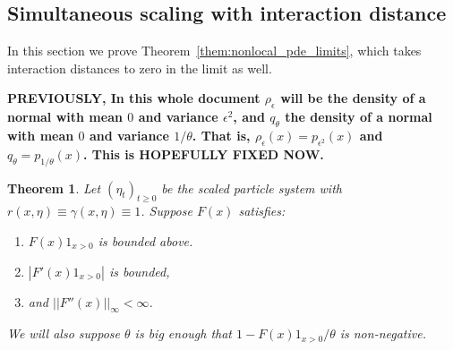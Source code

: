 \documentclass[12pt]{article}
\newtheorem{theorem}{Theorem}[section]
\begin{document}
\subsection{Simultaneous scaling with interaction distance}

In this section we prove Theorem~\ref{them:nonlocal_pde_limits},
which takes interaction distances to zero in the limit as well.

\textbf{PREVIOUSLY, In this whole document $\rho_\epsilon$ will be the density of a normal with mean $0$ and variance $\epsilon^2$, and $q_\theta$ the density of a normal with mean $0$ and variance $1/\theta$. That is, $\rho_\epsilon(x) = p_{\epsilon^2}(x)$ and $q_\theta = p_{1/\theta}(x)$. This is HOPEFULLY FIXED NOW.}

\begin{theorem} \label{TeoremOneStepConvergence}
    Let $(\eta_t)_{t \geq 0}$ be the scaled particle system with $r(x, \eta) \equiv \gamma(x, \eta) \equiv 1$.
    Suppose $F(x)$ satisfies:
    \begin{enumerate}
        \item $F(x)1_{x>0}$  is bounded above.
        \item $|F'(x)1_{x>0}|$ is bounded,
        \item and $||F''(x)||_\infty < \infty$.
    \end{enumerate}
    We will also suppose $\theta$ is big enough that $1- F(x)1_{x>0}/\theta$ is non-negative.


\end{theorem}
\end{document}
